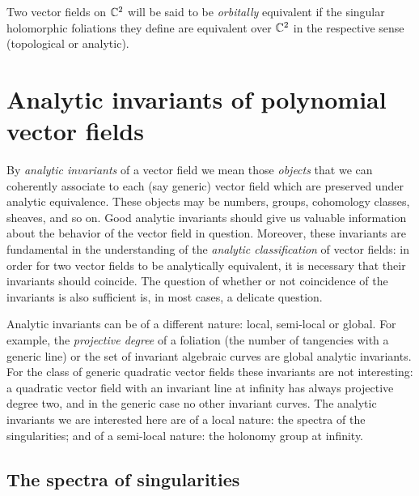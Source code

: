 \documentclass[phd,tocprelim]{cornell}
\begin{document}
\begin{definition}\label{def:orbitalEq}
 Two vector fields on $\mathbb{C}^2$ will be said to be \textit{orbitally} equivalent if the singular holomorphic foliations they define are equivalent over $\mathbb{C}^2$ in the respective sense (topological or analytic).
\end{definition}




\vspace{-1.5\parskip} %
\section{Analytic invariants of polynomial vector fields}\label{sec:analyticInvariants}

By \textit{analytic invariants} of a vector field we mean those \textit{objects} that we can coherently associate to each (say generic) vector field which are preserved under analytic equivalence. These objects may be numbers, groups, cohomology classes, sheaves, and so on. Good analytic invariants should give us valuable information about the behavior of the vector field in question. Moreover, these invariants are fundamental in the understanding of the \textit{analytic classification} of vector fields: in order for two vector fields to be analytically equivalent, it is necessary that their invariants should coincide. The question of whether or not coincidence of the invariants is also sufficient is, in most cases, a delicate question. 

Analytic invariants can be of a different nature: local, semi-local or global. For example, the \textit{projective degree} of a foliation (the number of tangencies with a generic line) or the set of invariant algebraic curves are global analytic invariants. For the class of generic quadratic vector fields these invariants are not interesting: a quadratic vector field with an invariant line at infinity has always projective degree two, and in the generic case no other invariant curves. The analytic invariants we are interested here are of a local nature: the spectra of the singularities; and of a semi-local nature: the holonomy group at infinity.


\subsection{The spectra of singularities}
\end{document}
